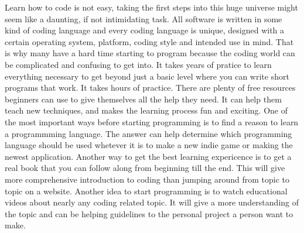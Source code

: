 Learn how to code is not easy, taking the first steps into this huge universe might seem like a daunting, if not intimidating task. All software is written in some kind of coding language and every coding language is unique, designed with a certain operating system, platform, coding style and intended use in mind. 
That is why many have a hard time starting to program because the coding world can be complicated and confusing to get into. It takes years of pratice to learn everything necessary to get beyond just a basic level where you can write short programs that work. It takes hours of practice.
There are plenty of free resources beginners can use to give themselves all the help they need. It can help them teach new techniques, and makes the learning process fun and exciting. 
One of the most important ways before starting programming is to find a reason to learn a programmming language. The answer can help determine which programming language should be used whetever it is to make a new indie game or making the newest application.
Another way to get the best learning expericence is to get a real book that you can follow along from beginning till the end. This will give more comprehensive introduction to coding than jumping around from topic to topic on a website. Another idea to start programming is to watch educational videos about nearly any coding related topic. 
It will give a more understanding of the topic and can be helping guidelines to the personal project a person want to make. 



  
